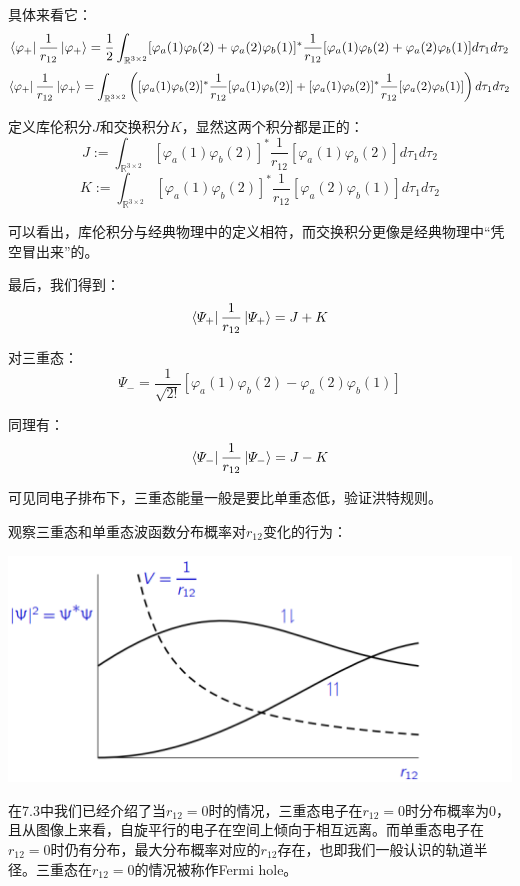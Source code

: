 具体来看它：
\[\bra{\varphi_{+}}\frac{1}{r_{12}}\ket{\varphi_{+}}=\frac{1}{2}\int_{\mathbb{R}^{3 \times 2}}[\varphi_a(1)\varphi_b(2)+\varphi_a(2)\varphi_b(1)]^{*}\frac{1}{r_{12}}[\varphi_a(1)\varphi_b(2)+\varphi_a(2)\varphi_b(1)]d\tau_1d\tau_2\]
\[\bra{\varphi_{+}}\frac{1}{r_{12}}\ket{\varphi_{+}}=\int_{\mathbb{R}^{3 \times 2}} \left ( [\varphi_a(1)\varphi_b(2)]^{*}\frac{1}{r_{12}}[\varphi_a(1)\varphi_b(2)]+[\varphi_a(1)\varphi_b(2)]^{*}\frac{1}{r_{12}}[\varphi_a(2)\varphi_b(1)] \right )d\tau_1d\tau_2\]

定义库伦积分$J$和交换积分$K$，显然这两个积分都是正的：
\[J:=\int_{\mathbb{R}^{3 \times 2}}[\varphi_a(1)\varphi_b(2)]^{*}\frac{1}{r_{12}}[\varphi_a(1)\varphi_b(2)]d\tau_1d\tau_2\]
\[K:=\int_{\mathbb{R}^{3 \times 2}}[\varphi_a(1)\varphi_b(2)]^{*}\frac{1}{r_{12}}[\varphi_a(2)\varphi_b(1)]d\tau_1d\tau_2\]

可以看出，库伦积分与经典物理中的定义相符，而交换积分更像是经典物理中“凭空冒出来”的。

最后，我们得到：
\[\bra{\varPsi_{+}}\frac{1}{r_{12}}\ket{\varPsi_{+}}=J+K\]

对三重态：
\[\varPsi_{-}=\frac{1}{\sqrt{2!}}[\varphi_a(1)\varphi_b(2)-\varphi_a(2)\varphi_b(1)]\]

同理有：
\[\bra{\varPsi_{-}}\frac{1}{r_{12}}\ket{\varPsi_{-}}=J-K\]

可见同电子排布下，三重态能量一般是要比单重态低，验证洪特规则。

观察三重态和单重态波函数分布概率对$r_{12}$变化的行为：
\begin{center}
    \includegraphics[scale=0.8]{fig/lzhx/微信图片_20211030111438.png}
\end{center}

在7.3中我们已经介绍了当$r_{12}=0$时的情况，三重态电子在$r_{12}=0$时分布概率为0，且从图像上来看，自旋平行的电子在空间上倾向于相互远离。而单重态电子在$r_{12}=0$时仍有分布，最大分布概率对应的$r_{12}$存在，也即我们一般认识的轨道半径。三重态在$r_{12}=0$的情况被称作Fermi hole。

